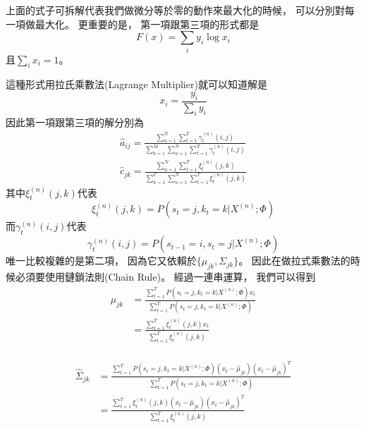     上面的式子可拆解代表我們做微分等於零的動作來最大化的時候，
    可以分別對每一項做最大化。
    更重要的是，
    第一項跟第三項的形式都是
    \begin{equation}
      F(x) = \sum_i y_i \log x_i
    \end{equation}
    且$\sum_i x_i = 1$。

    這種形式用拉氏乘數法(Lagrange Multiplier)就可以知道解是
    \begin{equation}
      x_i = \frac{y_i}{\sum_i y_i}
    \end{equation}
    因此第一項跟第三項的解分別為
    \begin{align}
      \hat{a}_{ij} = \frac{ \sum_{n=1}^N \sum_{t=1}^T \gamma^{(n)}_t (i,j) }{ \sum_{k=1}^M \sum_{n=1}^N \sum_{t=1}^T \gamma^{(n)}_t (i,j) } \\
      \hat{c}_{jk} = \frac{ \sum_{n=1}^N \sum_{t=1}^T \xi^{(n)}_t (j,k) }{ \sum_{k=1}^C \sum_{n=1}^N \sum_{t=1}^T \xi^{(n)}_t (j,k) }	  
    \end{align}
    其中$\xi^{(n)}_t (j, k)$代表
    \begin{equation}
      \xi^{(n)}_t (j, k) = P(s_t = j, k_t = k | X^{(n)}; \Phi)	
    \end{equation}  
    而$\gamma^{(n)}_t (i, j)$代表
    \begin{equation}
      \gamma^{(n)}_t (i, j) = P(s_{t-1} = i, s_t = j | X^{(n)}; \Phi)
    \end{equation}
    唯一比較複雜的是第二項，
    因為它又依賴於$\lbrace \mu_{jk}, \Sigma_{jk} \rbrace$。
    因此在做拉式乘數法的時候必須要使用鏈鎖法則(Chain Rule)。
    經過一連串運算，
    我們可以得到
    \begin{equation}
      \begin{split}
	\hat{\mu}_{jk} 
	&= \frac{ \sum_{t=1}^T P(s_t = j, k_t = k | X^{(n)} ;\Phi) x_t }{ \sum_{t=1}^T P(s_t = j, k_t = k | X^{(n)}; \Phi)} \\ 
	&= \frac{ \sum_{t=1}^T \xi^{(n)}_t(j, k) x_t }{ \sum_{t=1}^T \xi^{(n)}_t (j, k) } \\
      \end{split}
    \end{equation}

    \begin{equation}
      \begin{split}
	\hat{\Sigma}_{jk} 
	&= \frac{ \sum_{t=1}^T P(s_t = j, k_t = k | X^{(n)}; \Phi) (x_t - \hat{\mu}_{jk})(x_t - \hat{\mu}_{jk})^T }{ \sum_{t=1}^T P(s_t = j, k_t = k | X^{(n)}; \Phi) } \\
	&= \frac{ \sum_{t=1}^T \xi^{(n)}_t (j,k) (x_t - \hat{\mu}_{jk})(x_t - \hat{\mu}_{jk})^T }{ \sum_{t=1}^T \xi^{(n)}_t (j,k) } \\
      \end{split}
    \end{equation}

